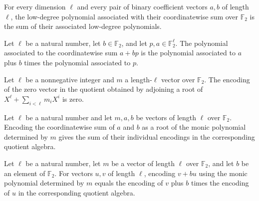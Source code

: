 \begin{theorem}
\label{FABL.binaryLowPolynomial_binaryAdd}
\leanok
{}
For every dimension $\ell$ and every pair of binary coefficient vectors $a,b$ of length
$\ell$, the low-degree polynomial associated with their coordinatewise sum over
$\mathbb{F}_2$ is the sum of their associated low-degree polynomials.
\end{theorem}

\begin{theorem}
\label{FABL.binaryLowPolynomial_binaryScaleAdd}
\leanok
{}
Let $\ell$ be a natural number, let $b\in\mathbb F_2$, and let $p,a\in\mathbb F_2^\ell$.
The polynomial associated to the coordinatewise sum $a+bp$ is the polynomial associated
to $a$ plus $b$ times the polynomial associated to $p$.
\end{theorem}

\begin{theorem}
\label{FABL.binaryAdjoinRootEncode_zero}
\leanok
{}
Let $\ell$ be a nonnegative integer and $m$ a length-$\ell$ vector over $\mathbb F_2$.
The encoding of the zero vector in the quotient obtained by adjoining a root of
$X^\ell+\sum_{i<\ell}m_iX^i$ is zero.
\end{theorem}

\begin{theorem}
\label{FABL.binaryAdjoinRootEncode_binaryAdd}
\leanok
{}
Let $\ell$ be a natural number and let $m,a,b$ be vectors of length $\ell$ over
$\mathbb{F}_2$. Encoding the coordinatewise sum of $a$ and $b$ as a root of the monic
polynomial determined by $m$ gives the sum of their individual encodings in the
corresponding quotient algebra.
\end{theorem}

\begin{theorem}
\label{FABL.binaryAdjoinRootEncode_binaryScaleAdd}
\leanok
{}
Let $\ell$ be a natural number, let $m$ be a vector of length $\ell$ over
$\mathbb{F}_2$, and let $b$ be an element of $\mathbb{F}_2$. For vectors $u,v$ of length
$\ell$, encoding $v+bu$ using the monic polynomial determined by $m$ equals the encoding
of $v$ plus $b$ times the encoding of $u$ in the corresponding quotient algebra.
\end{theorem}

